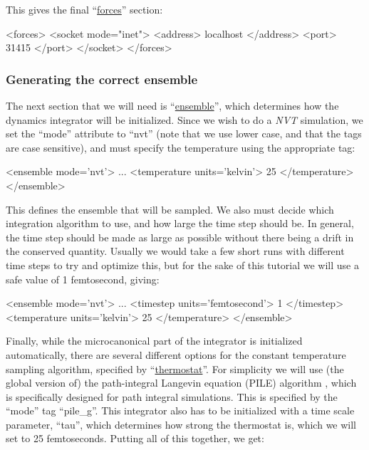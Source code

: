 \documentclass[11pt,english,fleqn]{report}
\newenvironment{code}{%
\footnotesize 
\verbatim
}{
\endverbatim
\normalsize
}
\begin{document}
This gives the final {}``\hyperref[FORCES]{forces}'' section:

\begin{code}
<forces>
   <socket mode="inet">
      <address> localhost </address>
      <port> 31415 </port>
   </socket>
</forces>
\end{code}

\subsubsection{Generating the correct ensemble}

The next section that we will need is 
{}``\hyperref[ENSEMBLE]{ensemble}'', which determines
how the dynamics integrator will be initialized. Since we wish to
do a \emph{NVT} simulation, we set the {}``mode'' attribute to {}``nvt''
(note that we use lower case, and that the tags are case sensitive),
and must specify the temperature using the appropriate tag:

\begin{code}
<ensemble mode='nvt'>
   ...
   <temperature units='kelvin'> 25 </temperature>
</ensemble>
\end{code}

This defines the ensemble that will be sampled. We also must decide
which integration algorithm to use, and how large the time step should
be. In general, the time step should be made as large as possible
without there being a drift in the conserved quantity. Usually we
would take a few short runs with different time steps to try and optimize
this, but for the sake of this tutorial we will use a safe value of
1 femtosecond, giving:

\begin{code}
<ensemble mode='nvt'>
   ...
   <timestep units='femtosecond'> 1 </timestep>
   <temperature units='kelvin'> 25 </temperature>
</ensemble>
\end{code}

Finally, while the microcanonical part of the integrator
is initialized automatically, there are several different options
for the constant temperature sampling algorithm,
specified by {}``\hyperref[THERMOSTATS]{thermostat}''. For simplicity we
will use (the global version of) the path-integral Langevin equation (PILE) algorithm \cite{ceri+10jcp},
which is specifically designed for path integral simulations. 
This is specified by the {}``mode'' tag {}``pile\_g''. 
This integrator also has to
be initialized with a time scale parameter, {}``tau'', which determines
how strong the thermostat is, which we will set to 25 femtoseconds. 
Putting all of this together, we get:
\end{document}

